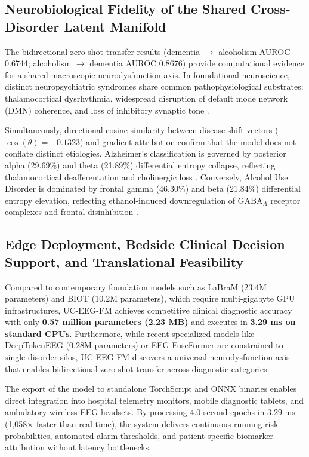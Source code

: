 \documentclass[11pt,a4paper]{article}
\begin{document}
\subsection{Neurobiological Fidelity of the Shared Cross-Disorder Latent Manifold}
The bidirectional zero-shot transfer results (dementia $\to$ alcoholism AUROC 0.6744; alcoholism $\to$ dementia AUROC 0.8676) provide computational evidence for a shared macroscopic neurodysfunction axis. In foundational neuroscience, distinct neuropsychiatric syndromes share common pathophysiological substrates: thalamocortical dysrhythmia, widespread disruption of default mode network (DMN) coherence, and loss of inhibitory synaptic tone \cite{llinas1999,rangaswamy2008}.

Simultaneously, directional cosine similarity between disease shift vectors ($\cos(\theta) = -0.1323$) and gradient attribution confirm that the model does not conflate distinct etiologies. Alzheimer's classification is governed by posterior alpha (29.69\%) and theta (21.89\%) differential entropy collapse, reflecting thalamocortical deafferentation and cholinergic loss \cite{babiloni2020}. Conversely, Alcohol Use Disorder is dominated by frontal gamma (46.30\%) and beta (21.84\%) differential entropy elevation, reflecting ethanol-induced downregulation of $\text{GABA}_A$ receptor complexes and frontal disinhibition \cite{enoch2008}.

\subsection{Edge Deployment, Bedside Clinical Decision Support, and Translational Feasibility}
Compared to contemporary foundation models such as LaBraM \cite{jiang2024labram} (23.4M parameters) and BIOT \cite{yang2023biot} (10.2M parameters), which require multi-gigabyte GPU infrastructures, UC-EEG-FM achieves competitive clinical diagnostic accuracy with only \textbf{0.57 million parameters (2.23 MB)} and executes in \textbf{3.29 ms on standard CPUs}. Furthermore, while recent specialized models like DeepTokenEEG \cite{nguyen2026deeptokeneeg} (0.28M parameters) or EEG-FuseFormer \cite{hariharan2026eegfuseformer} are constrained to single-disorder silos, UC-EEG-FM discovers a universal neurodysfunction axis that enables bidirectional zero-shot transfer across diagnostic categories.

The export of the model to standalone TorchScript and ONNX binaries enables direct integration into hospital telemetry monitors, mobile diagnostic tablets, and ambulatory wireless EEG headsets. By processing 4.0-second epochs in 3.29 ms (1,058$\times$ faster than real-time), the system delivers continuous running risk probabilities, automated alarm thresholds, and patient-specific biomarker attribution without latency bottlenecks.
\end{document}
